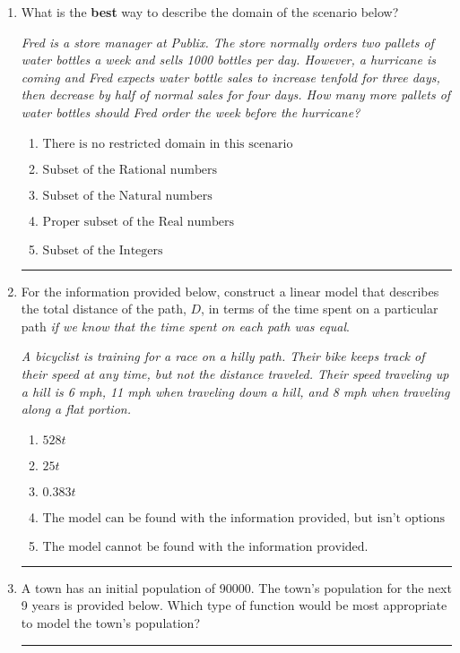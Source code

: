 \documentclass[14pt]{extbook}
\newcommand{\litem}[1]{\item#1\hspace*{-1cm}\rule{\textwidth}{0.4pt}}
\begin{document}
\begin{enumerate}
{\begin{enumerate}[label=\Alph*.]
\end{enumerate} }
\litem{
What is the \textbf{best} way to describe the domain of the scenario below?
\begin{center}
    \textit{ Fred is a store manager at Publix. The store normally orders two pallets of water bottles a week and sells 1000 bottles per day. However, a hurricane is coming and Fred expects water bottle sales to increase tenfold for three days, then decrease by half of normal sales for four days. How many more pallets of water bottles should Fred order the week before the hurricane? }
\end{center}
\begin{enumerate}[label=\Alph*.]
\item \( \text{There is no restricted domain in this scenario} \)
\item \( \text{Subset of the Rational numbers} \)
\item \( \text{Subset of the Natural numbers} \)
\item \( \text{Proper subset of the Real numbers} \)
\item \( \text{Subset of the Integers} \)

\end{enumerate} }
\litem{
For the information provided below, construct a linear model that describes the total distance of the path, $D$, in terms of the time spent on a particular path \textit{if we know that the time spent on each path was equal}.
\begin{center}
    \textit{ A bicyclist is training for a race on a hilly path. Their bike keeps track of their speed at any time, but not the distance traveled. Their speed traveling up a hill is 6 mph, 11 mph when traveling down a hill, and 8 mph when traveling along a flat portion. }
\end{center}
\begin{enumerate}[label=\Alph*.]
\item \( 528 t \)
\item \( 25 t \)
\item \( 0.383 t \)
\item \( \text{The model can be found with the information provided, but isn't options 1-3.} \)
\item \( \text{The model cannot be found with the information provided.} \)

\end{enumerate} }
\litem{
A town has an initial population of 90000. The town's population for the next 9 years is provided below. Which type of function would be most appropriate to model the town's population?

}
\end{enumerate}
\end{document}
